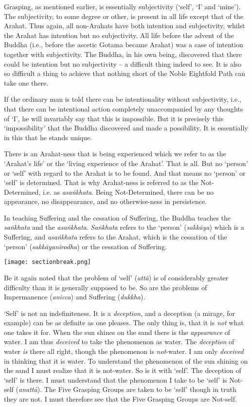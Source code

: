 Grasping, as mentioned earlier, is essentially subjectivity (`self', `I' and `mine'). The subjectivity, to some degree or other, is present in all life except that of the Arahat. Thus again, all non-Arahats have both intention and subjectivity, whilst the Arahat has intention but no subjectivity. All life before the advent of the Buddha (i.e., before the ascetic Gotama became Arahat) was a case of intention together with subjectivity. The Buddha, in his own being, discovered that there could be intention but no subjectivity -- a difficult thing indeed to see. It is also so difficult a thing to achieve that nothing short of the Noble Eightfold Path can take one there.

If the ordinary man is told there can be intentionality without subjectivity, i.e., that there can be intentional action completely unaccompanied by any thoughts of `I', he will invariably say that this is impossible. But it is precisely this `impossibility' that the Buddha discovered and made a possibility. It is essentially in this that he stands unique.

There is an Arahat-ness that is being experienced which we refer to as the `Arahat's life' or the `living experience of the Arahat'. That is all. But no `person' or `self' with regard to the Arahat is to be found. And that means no `person' or `self' is determined. That is why Arahat-ness is referred to as the Not-Determined, i.e. as \textit{asaṅkhata}. Being Not-Determined, there can be no appearance, no disappearance, and no otherwise-ness in persistence.

In teaching Suffering and the cessation of Suffering, the Buddha teaches the \textit{saṅkhata} and the \textit{asaṅkhata}. \textit{Saṅkhata} refers to the `person' (\textit{sakkāya}) which is a Suffering, and \textit{asaṅkhata} refers to the Arahat, which is the cessation of the `person' (\textit{sakkāyanirodha}) or the cessation of Suffering.

\texttt{[image: sectionbreak.png]}

Be it again noted that the problem of `self' (\textit{attā}) is of considerably greater difficulty than it is generally supposed to be. So are the problems of Impermanence (\textit{anicca}) and Suffering (\textit{dukkha}).

`Self' is not an indefiniteness. It is a \emph{deception}, and a deception (a mirage, for example) can be as definite as one pleases. The only thing is, that it is \emph{not} what one takes it for. When the sun shines on the sand there is the \emph{appearance} of water. I am thus \emph{deceived} to take the phenomenon as water. The \emph{deception} of water \emph{is} there all right, though the phenomenon is \emph{not}-water. I am only \emph{deceived} in thinking that it is water. To understand the phenomenon of the sun shining on the sand I must realize that it is not-water. So is it with `self'. The deception of `self' is there. I must understand that the phenomenon I take to be `self' is Not-self (\textit{anattā}). The Five Grasping Groups are taken to be `self' though in truth they are not. I must therefore see that the Five Grasping Groups are Not-self.

